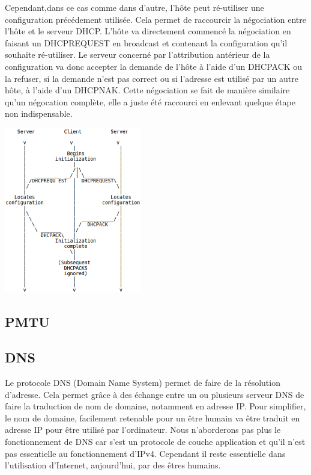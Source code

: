 Cependant,dans ce cas comme dans d'autre, l'hôte peut ré-utiliser une
configuration précédement utilisée. Cela permet de raccourcir la négociation
entre l'hôte et le serveur DHCP. L'hôte va directement commencé la négociation
en faisant un DHCPREQUEST en broadcast et contenant la configuration qu'il
souhaite ré-utiliser. Le serveur concerné par l'attribution antérieur de la
configuration va donc accepter la demande de l'hôte à l'aide d'un DHCPACK ou la
refuser, si la demande n'est pas correct ou si l'adresse est utilisé par un
autre hôte, à l'aide d'un DHCPNAK.  Cette négociation se fait de manière
similaire qu'un négocation complète, elle a juste été raccourci en enlevant
quelque étape non indispensable.

\includegraphics[width=6cm]{./pics/timeline_dhcp_reuse_add.eps}

\subsection{PMTU}
\subsection{DNS}
Le protocole DNS (Domain Name System) permet de faire de la résolution d'adresse.
Cela permet grâce à des échange entre un ou plusieurs serveur DNS de faire la traduction
de nom de domaine, notamment en adresse IP. Pour simplifier, le nom de domaine, facilement
retenable pour un être humain va être traduit en adresse IP pour être utilisé par l'ordinateur.
Nous n'aborderons pas plus le fonctionnement de DNS car s'est un protocole de couche application
et qu'il n'est pas essentielle au fonctionnement d'IPv4. Cependant il reste essentielle dans
l'utilisation d'Internet, aujourd'hui, par des êtres humains.
